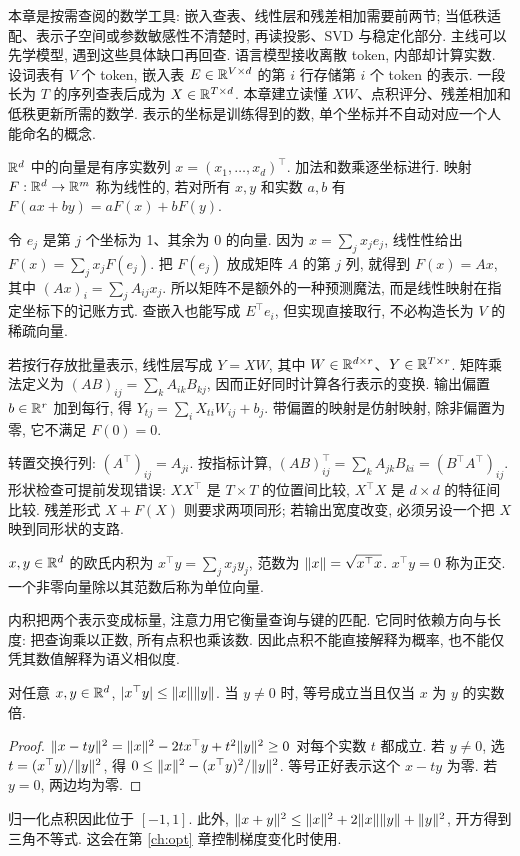 \label{ch:linear}
本章是按需查阅的数学工具: 嵌入查表、线性层和残差相加需要前两节; 当低秩适配、表示子空间或参数敏感性不清楚时, 再读投影、SVD 与稳定化部分. 主线可以先学模型, 遇到这些具体缺口再回查.
语言模型接收离散 token, 内部却计算实数. 设词表有 $V$ 个 token, 嵌入表 $E\in\mathbb R^{V\times d}$ 的第 $i$ 行存储第 $i$ 个 token 的表示. 一段长为 $T$ 的序列查表后成为 $X\in\mathbb R^{T\times d}$. 本章建立读懂 $XW$、点积评分、残差相加和低秩更新所需的数学. 表示的坐标是训练得到的数, 单个坐标并不自动对应一个人能命名的概念.

\begin{definition}
$\mathbb R^d$ 中的向量是有序实数列 $x=(x_1,\ldots,x_d)^\top$. 加法和数乘逐坐标进行. 映射 $F:\mathbb R^d\to\mathbb R^m$ 称为线性的, 若对所有 $x,y$ 和实数 $a,b$ 有 $F(ax+by)=aF(x)+bF(y)$.
\end{definition}
令 $e_j$ 是第 $j$ 个坐标为 1、其余为 0 的向量. 因为 $x=\sum_jx_je_j$, 线性性给出 $F(x)=\sum_jx_jF(e_j)$. 把 $F(e_j)$ 放成矩阵 $A$ 的第 $j$ 列, 就得到 $F(x)=Ax$, 其中 $(Ax)_i=\sum_jA_{ij}x_j$. 所以矩阵不是额外的一种预测魔法, 而是线性映射在指定坐标下的记账方式. 查嵌入也能写成 $E^\top e_i$, 但实现直接取行, 不必构造长为 $V$ 的稀疏向量.

若按行存放批量表示, 线性层写成 $Y=XW$, 其中 $W\in\mathbb R^{d\times r}$、$Y\in\mathbb R^{T\times r}$. 矩阵乘法定义为 $(AB)_{ij}=\sum_kA_{ik}B_{kj}$, 因而正好同时计算各行表示的变换. 输出偏置 $b\in\mathbb R^r$ 加到每行, 得 $Y_{tj}=\sum_iX_{ti}W_{ij}+b_j$. 带偏置的映射是仿射映射, 除非偏置为零, 它不满足 $F(0)=0$.

转置交换行列: $(A^\top)_{ij}=A_{ji}$. 按指标计算,
$(AB)^\top_{ij}=\sum_kA_{jk}B_{ki}=(B^\top A^\top)_{ij}$.
形状检查可提前发现错误: $XX^\top$ 是 $T\times T$ 的位置间比较, $X^\top X$ 是 $d\times d$ 的特征间比较. 残差形式 $X+F(X)$ 则要求两项同形; 若输出宽度改变, 必须另设一个把 $X$ 映到同形状的支路.

\begin{definition}
$x,y\in\mathbb R^d$ 的欧氏内积为 $x^\top y=\sum_jx_jy_j$, 范数为 $\lVert x\rVert=\sqrt{x^\top x}$. $x^\top y=0$ 称为正交. 一个非零向量除以其范数后称为单位向量.
\end{definition}
内积把两个表示变成标量, 注意力用它衡量查询与键的匹配. 它同时依赖方向与长度: 把查询乘以正数, 所有点积也乘该数. 因此点积不能直接解释为概率, 也不能仅凭其数值解释为语义相似度.

\begin{proposition}
对任意 $x,y\in\mathbb R^d$, $|x^\top y|\le\lVert x\rVert\lVert y\rVert$. 当 $y\ne0$ 时, 等号成立当且仅当 $x$ 为 $y$ 的实数倍.
\end{proposition}
\begin{proof}
$\lVert x-ty\rVert^2=\lVert x\rVert^2-2t x^\top y+t^2\lVert y\rVert^2\ge0$ 对每个实数 $t$ 都成立. 若 $y\ne0$, 选 $t=(x^\top y)/\lVert y\rVert^2$, 得
$0\le\lVert x\rVert^2-(x^\top y)^2/\lVert y\rVert^2$.
等号正好表示这个 $x-ty$ 为零. 若 $y=0$, 两边均为零.
\end{proof}
归一化点积因此位于 $[-1,1]$. 此外,
$\lVert x+y\rVert^2\le\lVert x\rVert^2+2\lVert x\rVert\lVert y\rVert+\lVert y\rVert^2$, 开方得到三角不等式. 这会在第 \ref{ch:opt} 章控制梯度变化时使用.

